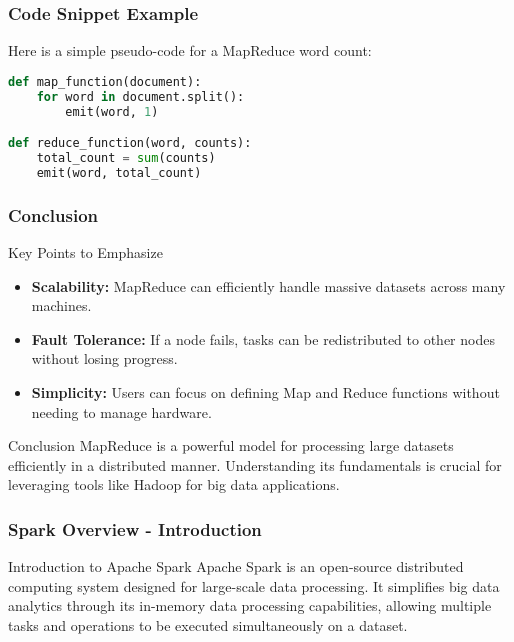 \documentclass[aspectratio=169]{beamer}
\begin{document}
\begin{frame}[fragile]
  \frametitle{Code Snippet Example}
  Here is a simple pseudo-code for a MapReduce word count:
  \begin{lstlisting}[language=Python]
def map_function(document):
    for word in document.split():
        emit(word, 1)

def reduce_function(word, counts):
    total_count = sum(counts)
    emit(word, total_count)
  \end{lstlisting}
\end{frame}

\begin{frame}[fragile]
  \frametitle{Conclusion}
  \begin{block}{Key Points to Emphasize}
    \begin{itemize}
      \item \textbf{Scalability:} MapReduce can efficiently handle massive datasets across many machines.
      \item \textbf{Fault Tolerance:} If a node fails, tasks can be redistributed to other nodes without losing progress.
      \item \textbf{Simplicity:} Users can focus on defining Map and Reduce functions without needing to manage hardware.
    \end{itemize}
  \end{block}

  \begin{block}{Conclusion}
    MapReduce is a powerful model for processing large datasets efficiently in a distributed manner. Understanding its fundamentals is crucial for leveraging tools like Hadoop for big data applications.
  \end{block}
\end{frame}

\begin{frame}[fragile]
    \frametitle{Spark Overview - Introduction}
    \begin{block}{Introduction to Apache Spark}
        Apache Spark is an open-source distributed computing system designed for large-scale data processing. It simplifies big data analytics through its in-memory data processing capabilities, allowing multiple tasks and operations to be executed simultaneously on a dataset.
    \end{block}
\end{frame}
\end{document}
